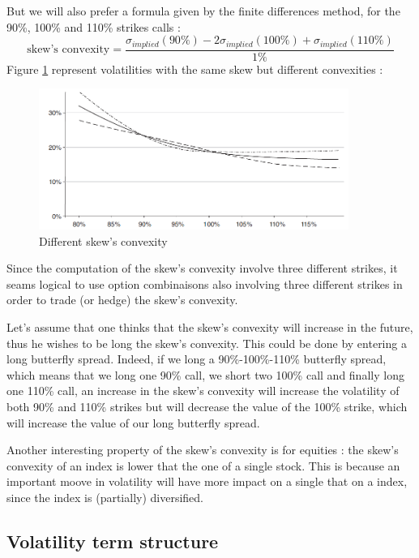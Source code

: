 \documentclass[hidelinks]{article}
\theoremstyle{definition}
\begin{document}
   But we will also prefer a formula given by the finite differences method, for the 90\%, 100\% and 110\% strikes calls :
   $$\text{skew's convexity} = \frac{\sigma_{implied}(90\%) - 2 \sigma_{implied}(100\%) + \sigma_{implied}(110\%)}{1\%}$$
   Figure \ref{fig:skew_convexity} represent volatilities with the same skew but different convexities :
   \begin{figure}[!h]
	\centering
	\includegraphics[width=0.9\textwidth]{skew_convexity.png}
    \caption{Different skew's convexity}
    \label{fig:skew_convexity}
    \end{figure}
    
   Since the computation of the skew's convexity involve three different strikes, it seams logical to use option combinaisons also involving three different strikes in order to trade (or hedge) the skew's convexity. 
   
   Let's assume that one thinks that the skew's convexity will increase in the future, thus he wishes to be long the skew's convexity. This could be done by entering a long butterfly spread. Indeed, if we long a 90\%-100\%-110\% butterfly spread, which means that we long one 90\% call, we short two 100\% call and finally long one 110\% call, an increase in the skew's convexity will increase the volatility of both 90\% and 110\% strikes but will decrease the value of the 100\% strike, which will increase the value of our long butterfly spread.
   
   Another interesting property of the skew's convexity is for equities : the skew's convexity of an index is lower that the one of a single stock. This is because an important moove in volatility will have more impact on a single that on a index, since the index is (partially) diversified.
   
   
   \newpage
   \subsection{Volatility term structure}
   
\end{document}
